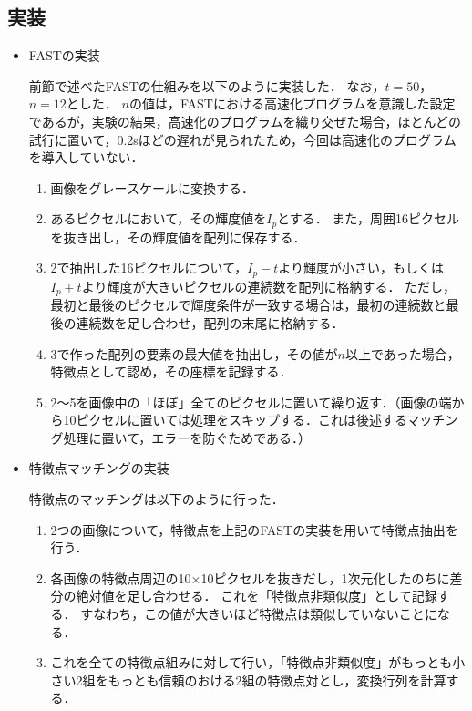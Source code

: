 \subsection{実装}
\begin{itemize}
    \setlength{\itemsep}{5mm}
    \item FASTの実装\par
    \vspace{1mm}
    \quad
    前節で述べたFASTの仕組みを以下のように実装した．
    なお，$t=50$，$n=12$とした．
    $n$の値は，FASTにおける高速化プログラムを意識した設定であるが，実験の結果，高速化のプログラムを織り交ぜた場合，ほとんどの試行に置いて，0.2sほどの遅れが見られたため，今回は高速化のプログラムを導入していない．
    \begin{enumerate}
        \item 画像をグレースケールに変換する．
        \item あるピクセルにおいて，その輝度値を$I_p$とする．
        また，周囲16ピクセルを抜き出し，その輝度値を配列に保存する．
        \item 2で抽出した16ピクセルについて，$I_p-t$より輝度が小さい，もしくは$I_p+t$より輝度が大きいピクセルの連続数を配列に格納する．
        ただし，最初と最後のピクセルで輝度条件が一致する場合は，最初の連続数と最後の連続数を足し合わせ，配列の末尾に格納する．
        \item 3で作った配列の要素の最大値を抽出し，その値が$n$以上であった場合，特徴点として認め，その座標を記録する．
        \item 2～5を画像中の「ほぼ」全てのピクセルに置いて繰り返す．（画像の端から10ピクセルに置いては処理をスキップする．これは後述するマッチング処理に置いて，エラーを防ぐためである．）
    \end{enumerate}
    \item 特徴点マッチングの実装\par
    \vspace{1mm}
    \quad
    特徴点のマッチングは以下のように行った．
    \begin{enumerate}
        \item 2つの画像について，特徴点を上記のFASTの実装を用いて特徴点抽出を行う．
        \item 各画像の特徴点周辺の10×10ピクセルを抜きだし，1次元化したのちに差分の絶対値を足し合わせる．
        これを「特徴点非類似度」として記録する．
        すなわち，この値が大きいほど特徴点は類似していないことになる．
        \item これを全ての特徴点組みに対して行い，「特徴点非類似度」がもっとも小さい2組をもっとも信頼のおける2組の特徴点対とし，変換行列を計算する．
    \end{enumerate}
\end{itemize}
